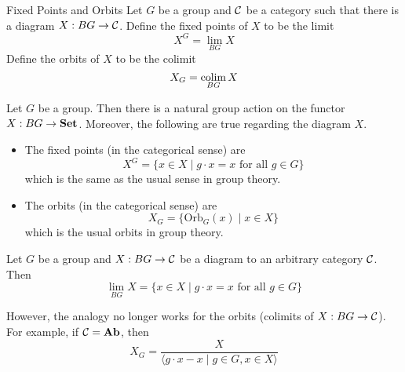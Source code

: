 \documentclass[a4paper]{article}
\begin{document}
\begin{defn}{Fixed Points and Orbits}{} Let $G$ be a group and $\mathcal{C}$ be a category such that there is a diagram $X:BG\to\mathcal{C}$. Define the fixed points of $X$ to be the limit $$X^G=\lim_{BG}X$$ Define the orbits of $X$ to be the colimit $$X_G=\operatorname*{colim}_{BG}X$$
\end{defn}

\begin{thm}{}{} Let $G$ be a group. Then there is a natural group action on the functor $X:BG\to\bold{Set}$. Moreover, the following are true regarding the diagram $X$. 
\begin{itemize}
\item The fixed points (in the categorical sense) are $$X^G=\{x\in X\;|\;g\cdot x=x\text{ for all }g\in G\}$$ which is the same as the usual sense in group theory. 
\item The orbits (in the categorical sense) are $$X_G=\{\text{Orb}_G(x)\;|\;x\in X\}$$ which is the usual orbits in group theory. 
\end{itemize}
\end{thm}

\begin{prp}{}{} Let $G$ be a group and $X:BG\to\mathcal{C}$ be a diagram to an arbitrary category $\mathcal{C}$. Then $$\lim_{BG}X=\{x\in X\;|\;g\cdot x=x\text{ for all }g\in G\}$$
\end{prp}

However, the analogy no longer works for the orbits (colimits of $X:BG\to\mathcal{C}$). For example, if $\mathcal{C}=\bold{Ab}$, then $$X_G=\frac{X}{\langle g\cdot x-x\;|\;g\in G,x\in X\rangle}$$
\end{document}
